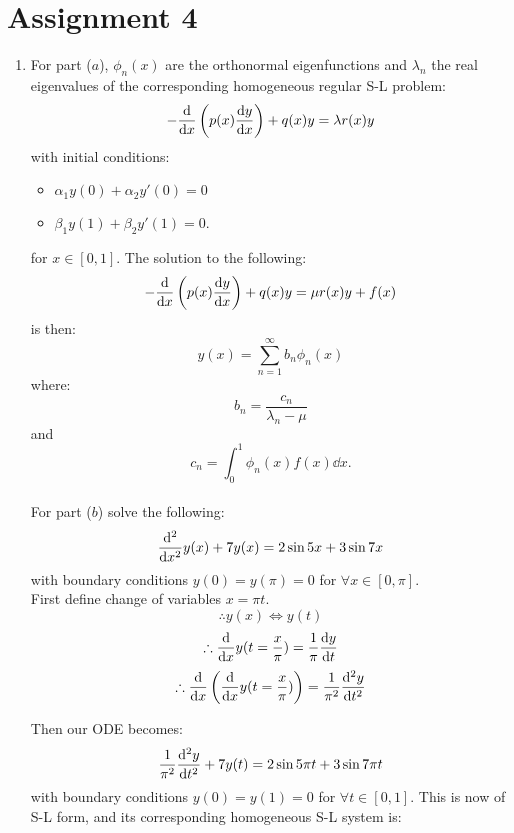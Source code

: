 \pagestyle{fancy}
\fancyhead{}

\section{Assignment 4}
\begin{enumerate}
    \item For part ($a$), $\phi_n(x)$ are the orthonormal
    eigenfunctions and $\lambda_n$ the real eigenvalues of the
    corresponding homogeneous regular S-L problem:
    $$-\dv{x}\left(p(x)\dv{y}{x}\right)+q(x)y=\lambda r(x)y$$
    with initial conditions:
    \begin{itemize}
        \item $\alpha_1 y(0)+\alpha_2 y'(0)=0$
    
        \item $\beta_1 y(1)+\beta_2 y'(1)=0.$
    \end{itemize}
    for $x\in[0,1]$. The solution to the following:
    $$-\dv{x}\left(p(x)\dv{y}{x}\right)+q(x)y=\mu r(x)y+f(x)$$
    is then:
    $$y(x)=\sum_{n=1}^{\infty}b_n\phi_n(x)$$
    where:
    $$b_n=\frac{c_n}{\lambda_n-\mu}$$
    and
    $$c_n=\int_{0}^{1}\phi_n(x)f(x)\dd x.$$ \\

    For part ($b$) solve the following:
    $$\dv[2]{x}y(x)+7y(x)=2\sin 5x+3\sin 7x$$
    with boundary conditions $y(0)=y(\pi)=0$
    for $\forall x\in[0,\pi]$. \\

    First define change of variables $x=\pi t$.
    $$\therefore y(x)\iff y(t)$$
    $$\therefore \dv{x}y(t=\frac{x}{\pi})=\frac{1}{\pi}\dv{y}{t}$$
    $$\therefore \dv{x}\left(\dv{x}y(t=\frac{x}{\pi})\right)
    =\frac{1}{\pi^2}\dv[2]{y}{t}$$

    \newpage

    Then our ODE becomes:
    $$\frac{1}{\pi^2}\dv[2]{y}{t}+7y(t)=2\sin 5\pi t+3\sin 7\pi t$$
    with boundary conditions $y(0)=y(1)=0$
    for $\forall t\in[0,1]$. This is now of S-L form, and its
    corresponding homogeneous S-L system is:
    
\end{enumerate}